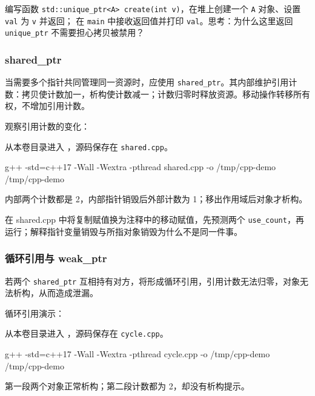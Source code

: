 \begin{exercise}\label{ex:v1-cpp-unique}

编写函数 \texttt{std::unique\_ptr<A> create(int v)}，在堆上创建一个 \texttt{A} 对象、设置 \texttt{val} 为 \texttt{v} 并返回；
在 \texttt{main} 中接收返回值并打印 \texttt{val}。思考：为什么这里返回 \texttt{unique\_ptr} 不需要担心拷贝被禁用？
\end{exercise}

\subsubsection{shared\_ptr}
当需要多个指针共同管理同一资源时，应使用 \texttt{shared\_ptr}。其内部维护引用计数：拷贝使计数加一，析构使计数减一；计数归零时释放资源。移动操作转移所有权，不增加引用计数。

\begin{example}
观察引用计数的变化：



从本卷目录进入 ，源码保存在 \texttt{shared.cpp}。
\begin{tbash}
g++ -std=c++17 -Wall -Wextra -pthread shared.cpp -o /tmp/cpp-demo
/tmp/cpp-demo
\end{tbash}
内部两个计数都是 2，内部指针销毁后外部计数为 1；移出作用域后对象才析构。
\end{example}

\begin{exercise}
\label{ex:v1-cpp-shared}
在 shared.cpp 中将复制赋值换为注释中的移动赋值，先预测两个 \texttt{use\_count}，再运行；解释指针变量销毁与所指对象销毁为什么不是同一件事。
\end{exercise}

\subsubsection{循环引用与 weak\_ptr}
若两个 \texttt{shared\_ptr} 互相持有对方，将形成循环引用，引用计数无法归零，对象无法析构，从而造成泄漏。

\begin{example}
循环引用演示：


从本卷目录进入 ，源码保存在 \texttt{cycle.cpp}。
\begin{tbash}
g++ -std=c++17 -Wall -Wextra -pthread cycle.cpp -o /tmp/cpp-demo
/tmp/cpp-demo
\end{tbash}
第一段两个对象正常析构；第二段计数都为 2，却没有析构提示。
\end{example}


